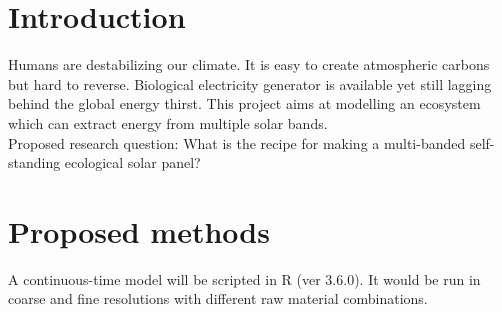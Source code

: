 \documentclass[a4paper, 11pt]{article}
\begin{document}
\section{Introduction}
Humans are destabilizing our climate\autocite{schuur2015climate}.  It is easy to create atmospheric carbons but hard to reverse\autocite{yang2008progress}.  Biological electricity generator is available\autocite{mccormick2015biophotovoltaics} yet still lagging behind the global energy thirst\autocite{ferguson2000electricity}.  This project aims at modelling an ecosystem which can extract energy from multiple solar bands.\\
Proposed research question: What is the recipe for making a multi-banded self-standing ecological solar panel?
\section{Proposed methods}
A continuous-time model will be scripted in R (ver 3.6.0).  It would be run in coarse and fine resolutions with different raw material combinations.
\end{document}
